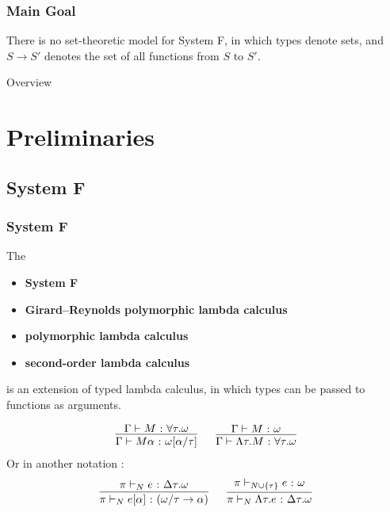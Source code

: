 \begin{frame}[t,plain]
\titlepage
\end{frame}

\renewcommand{\colon}{\mbox{~:~}}

\begin{frame}[fragile]
    \frametitle{Main Goal}
  
    There is no set-theoretic model for System F, in which types denote sets, and $S \rightarrow S'$ denotes the set of all functions from $S$ to $S'$.
\end{frame}

\begin{frame}{Overview}
\tableofcontents
\end{frame}

\section{Preliminaries}

\subsection{System F}

\begin{frame}[fragile]
    \frametitle{System F}
  
    The
    \begin{itemize}
        \item \textbf{System F}
        \item \textbf{Girard--Reynolds polymorphic lambda calculus}
        \item \textbf{polymorphic lambda calculus}
        \item \textbf{second-order lambda calculus}
    \end{itemize}
    is an extension of typed lambda calculus, in which types can be passed to functions as arguments.
  
    $$
    \begin{matrix}
    \infer{\Gamma \vdash M\alpha \colon \omega[\alpha/\tau]}{\Gamma \vdash M \colon \forall\tau.\omega}
    \ &\ 
    \infer{\Gamma \vdash \Lambda\tau. M \colon \forall\tau.\omega}{\Gamma \vdash M \colon \omega}
    \end{matrix}
    $$
    \pause
    Or in another notation \cite{REYNOLDS19931}:
    $$
    \begin{matrix}
    \infer{\pi \vdash_N e[\alpha] \colon (\omega / \tau \rightarrow \alpha)}{\pi \vdash_N e \colon \Delta\tau.\omega}
    \ &\ 
    \infer{\pi \vdash_N \Lambda\tau. e \colon \Delta\tau.\omega}{\pi \vdash_{N \cup \{\tau\}} e \colon \omega}
    \end{matrix}
    $$
\end{frame}

